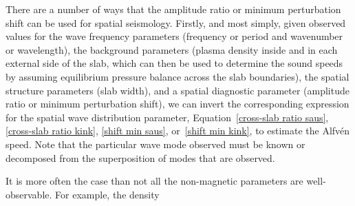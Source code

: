\documentclass[namedreferences]{solarphysics}
\numberwithin{equation}{section}
\begin{document}
\begin{article}
There are a number of ways that the amplitude ratio or minimum perturbation shift can be used for spatial seismology. Firstly, and most simply, given observed values for the wave frequency parameters (frequency or period and wavenumber or wavelength), the background parameters (plasma density inside and in each external side of the slab, which can then be used to determine the sound speeds by assuming equilibrium pressure balance across the slab boundaries), the spatial structure parameters (slab width), and a spatial diagnostic parameter (amplitude ratio or minimum perturbation shift), we can invert the corresponding expression for the spatial wave distribution parameter, Equation~\eqref{cross-slab ratio saus}, \eqref{cross-slab ratio kink}, \eqref{shift min saus}, or~\eqref{shift min kink}, to estimate the Alfv\'{e}n speed. Note that the particular wave mode observed must be known or decomposed from the superposition of modes that are observed.

It is more often the case than not all the non-magnetic parameters are well-observable. For example, the density 


\end{article}
\end{document}
